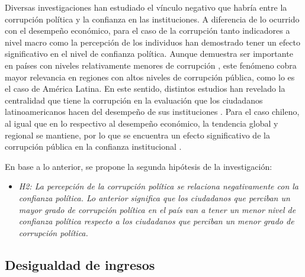 \documentclass[12pt,twoside]{templates/facsothesis}
\providecommand{\tightlist}{%
  \setlength{\itemsep}{0pt}\setlength{\parskip}{0pt}}
\begin{document}
Diversas investigaciones han estudiado el vínculo negativo que habría entre la corrupción política y la confianza en las instituciones. A diferencia de lo ocurrido con el desempeño económico, para el caso de la corrupción tanto indicadores a nivel macro como la percepción de los individuos han demostrado tener un efecto significativo en el nivel de confianza política. Aunque demuestra ser importante en países con niveles relativamente menores de corrupción \citep{andersonCorruptionPoliticalAllegiances2003, vandermeerPoliticalTrustEvaluation2017, wangGovernmentPerformanceCorruption2016}, este fenómeno cobra mayor relevancia en regiones con altos niveles de corrupción pública, como lo es el caso de América Latina. En este sentido, distintos estudios han revelado la centralidad que tiene la corrupción en la evaluación que los ciudadanos latinoamericanos hacen del desempeño de sus instituciones \citep{boothLegitimacyPuzzleLatin2009, mainwaringStateDeficienciesParty2006, morrisCorruptionTrustTheoretical2010, seligsonImpactCorruptionRegime2002a, stoyanTrustGovernmentInstitutions2016}. Para el caso chileno, al igual que en lo respectivo al desempeño económico, la tendencia global y regional se mantiene, por lo que se encuentra un efecto significativo de la corrupción pública en la confianza institucional \citep{riffoQueInfluyeConfianza2019, saldanazunigaConfianzaInstitucionesPoliticas2019, segoviaMalaiseDemocracyChile2016}.

En base a lo anterior, se propone la segunda hipótesis de la investigación:

\begin{itemize}
\tightlist
\item
  \emph{H2: La percepción de la corrupción política se relaciona negativamente con la confianza política. Lo anterior significa que los ciudadanos que perciban un mayor grado de corrupción política en el país van a tener un menor nivel de confianza política respecto a los ciudadanos que perciban un menor grado de corrupción política.}
\end{itemize}

\subsection{Desigualdad de ingresos}\label{desigualdad-de-ingresos}
\end{document}
